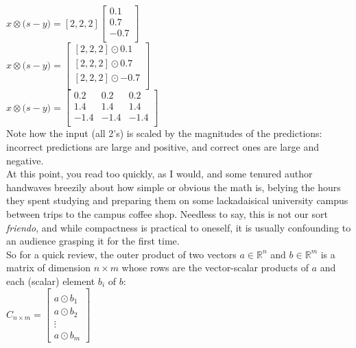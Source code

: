 \documentclass{article}
\begin{document}
$x \otimes \big(s - y\big) = [2,2,2]
\begin{bmatrix} 0.1 \\
         0.7 \\
         -0.7 \\
         \end{bmatrix}
$ \\

$x \otimes \big(s - y\big) =
\begin{bmatrix} [2,2,2] \odot 0.1 \\
         [2,2,2] \odot 0.7\\
         [2,2,2] \odot -0.7\\
         \end{bmatrix}
$ \\

$x \otimes \big(s - y\big) =
\begin{bmatrix} 0.2 & 0.2 & 0.2 \\
         1.4 & 1.4 & 1.4 \\
         -1.4 & -1.4 & -1.4 \\
         \end{bmatrix}
$ \\

Note how the input (all 2's) is scaled by the magnitudes of the predictions: incorrect predictions are large and positive, and correct ones are large and negative. \\

At this point, you read too quickly, as I would, and some tenured author handwaves breezily about how simple or obvious the math is, belying the hours they spent studying and preparing them on some lackadaisical university campus between trips to the campus coffee shop. Needless to say, this is not our sort \textit{friendo}, and while compactness is practical to oneself, it is usually confounding to an audience grasping it for the first time. \\

So for a quick review, the outer product of two vectors $a \in \mathbb{R}^{n}$ and $b \in \mathbb{R}^{m}$ is a matrix of dimension $n \times m$ whose rows are the vector-scalar products of $a$ and each (scalar) element $b_{i}$ of $b$: \\
$C_{n \times m} = \begin{bmatrix} \\
         a \odot b_{1} \\
         a \odot b_{2} \\
          \vdots \\
         a \odot b_{m}
         \end{bmatrix}
$ \\
\end{document}
